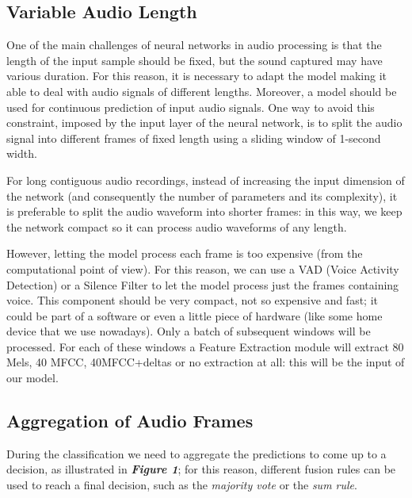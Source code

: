 \documentclass[conference]{IEEEtran}
\begin{document}
\subsection{Variable Audio Length}
One of the main challenges of neural networks in audio processing is that the length of the input sample should be fixed, but the sound captured may have various duration. For this reason, it is necessary to adapt the model making it able to deal with audio signals of different lengths. Moreover, a model should be used for continuous prediction of input audio signals. One way to avoid this constraint, imposed by the input layer of the neural network, is to split the audio signal into different frames of fixed length using a sliding window of 1-second width.

For long contiguous audio recordings, instead of increasing the input dimension of the network (and consequently the number of parameters and its complexity), it is preferable to split the audio waveform into shorter frames: in this way, we keep the network compact so it can process audio waveforms of any length.

However, letting the model process each frame is too expensive (from the computational point of view). For this reason, we can use a VAD (Voice Activity Detection) or a Silence Filter to let the model process just the frames containing voice. This component should be very compact, not so expensive and fast; it could be part of a software or even a little piece of hardware (like some home device that we use nowadays).
Only a batch of subsequent windows will be processed. For each of these windows a Feature Extraction module will extract 80 Mels, 40 MFCC, 40MFCC+deltas or no extraction at all: this will be the input of our model.

\subsection{Aggregation of Audio Frames}
During the classification we need to aggregate the predictions to come up to a decision, as illustrated in \textbf{\textit{Figure 1}}; for this reason, different fusion rules can be used to reach a final decision, such as the \textit{majority vote} or the \textit{sum rule}.
\end{document}

